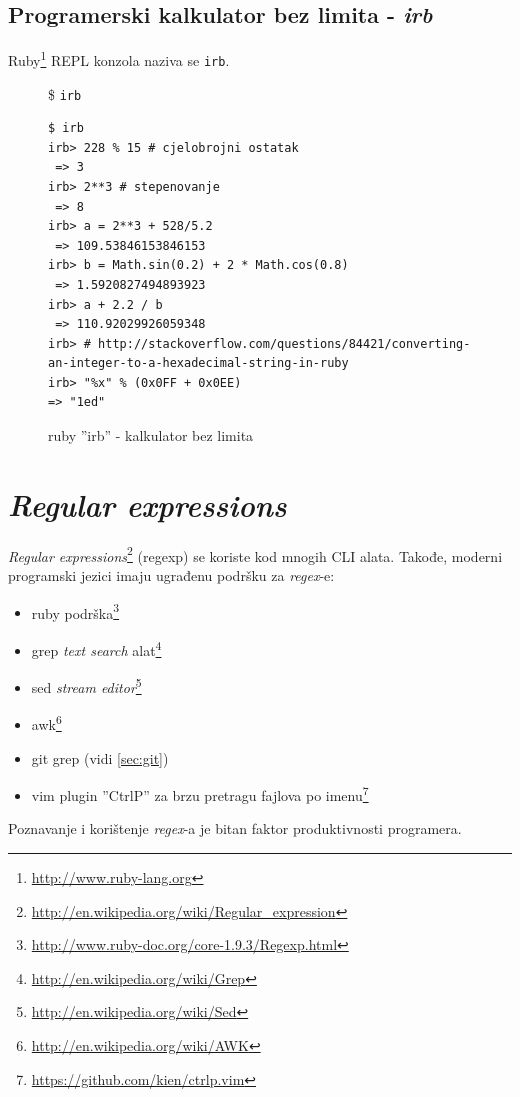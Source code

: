 \documentclass[times, utf8, seminar]{fit}
\begin{document}
\subsection{Programerski kalkulator bez limita - \emph{irb}}

Ruby\footnote{\url{http://www.ruby-lang.org}} REPL konzola naziva se \verb+irb+. 


\begin{figure}[H]
\$ \verb+irb+

\begin{lstlisting}
$ irb
irb> 228 % 15 # cjelobrojni ostatak
 => 3 
irb> 2**3 # stepenovanje
 => 8 
irb> a = 2**3 + 528/5.2
 => 109.53846153846153 
irb> b = Math.sin(0.2) + 2 * Math.cos(0.8)
 => 1.5920827494893923 
irb> a + 2.2 / b
 => 110.92029926059348
irb> # http://stackoverflow.com/questions/84421/converting-an-integer-to-a-hexadecimal-string-in-ruby
irb> "%x" % (0x0FF + 0x0EE) 
=> "1ed" 

\end{lstlisting}

\caption{ruby ''irb'' - kalkulator bez limita}
\end{figure}

\section{\emph{Regular expressions}}

\emph{Regular expressions}\footnote{\url{http://en.wikipedia.org/wiki/Regular_expression}} (regexp) se koriste kod mnogih CLI alata. Takođe, moderni programski jezici imaju ugrađenu podršku za \emph{regex}-e:
\begin{itemize}
   \item ruby podrška\footnote{\url{http://www.ruby-doc.org/core-1.9.3/Regexp.html}}
   \item grep \emph{text search} alat\footnote{\url{http://en.wikipedia.org/wiki/Grep}}
   \item sed \emph{stream editor}\footnote{\url{http://en.wikipedia.org/wiki/Sed}}
   \item awk\footnote{\url{http://en.wikipedia.org/wiki/AWK}}
   \item git grep (vidi \ref{sec:git})
   \item vim plugin ''CtrlP'' za brzu pretragu fajlova po imenu\footnote{\url{https://github.com/kien/ctrlp.vim}}
\end{itemize}

Poznavanje i korištenje \emph{regex}-a je bitan faktor produktivnosti programera.
 
\end{document}
